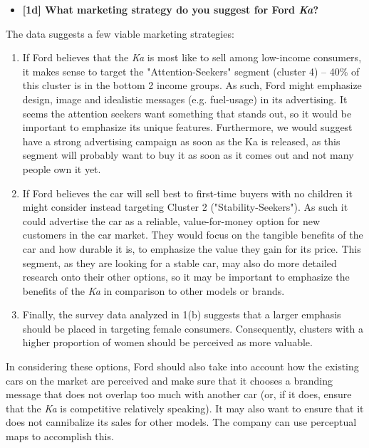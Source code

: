 \documentclass[10pt, oneside,spanish]{article}
\begin{document}
\begin{itemize}
\item \textbf{[1d] What marketing strategy do you suggest for Ford \textit{Ka}?  }
\end{itemize}

The data suggests a few viable marketing strategies:

\begin{enumerate}
\item If Ford believes that the \textit{Ka} is most like to sell among low-income consumers, it makes sense to target the "Attention-Seekers" segment (cluster 4) -- 40\% of this cluster is in the bottom 2 income groups. As such, Ford might emphasize design, image and idealistic messages (e.g. fuel-usage) in its advertising. It seems the attention seekers want something that stands out, so it would be important to emphasize its unique features. Furthermore, we would suggest have a strong advertising campaign as soon as the Ka is released, as this segment will probably want to buy it as soon as it comes out and not many people own it yet.

\item If Ford believes the car will sell best to first-time buyers with no children it might consider instead targeting Cluster 2 ("Stability-Seekers"). As such it could advertise the car as a reliable, value-for-money option for new customers in the car market. They would focus on the tangible benefits of the car and how durable it is, to emphasize the value they gain for its price. This segment, as they are looking for a stable car, may also do more detailed research onto their other options, so it may be important to emphasize the benefits of the \textit{Ka} in comparison to other models or brands. 

\item Finally, the survey data analyzed in 1(b) suggests that a larger emphasis should be placed in targeting female consumers. Consequently, clusters with a higher proportion of women should be perceived as more valuable.
\end{enumerate}
In considering these options, Ford should also take into account how the existing cars on the market are perceived and make sure that it chooses a branding message that does not overlap too much with another car (or, if it does, ensure that the \textit{Ka} is competitive relatively speaking). It may also want to ensure that it does not cannibalize its sales for other models.  The company can use perceptual maps to accomplish this. 
\end{document}
